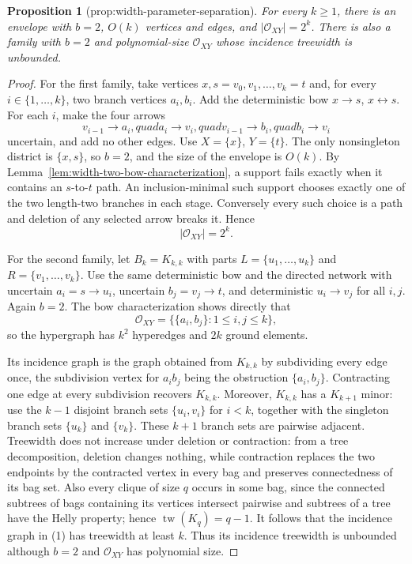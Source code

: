 \documentclass{article}
\newtheorem{proposition}{Proposition}
\begin{document}
\begin{proposition}[prop:width-parameter-separation]\label{prop:width-parameter-separation}
For every \(k\ge1\), there is an envelope with \(b=2\), \(O(k)\) vertices and edges, and \(|\mathcal O_{XY}|=2^k\). There is also a family with \(b=2\) and polynomial-size \(\mathcal O_{XY}\) whose incidence treewidth is unbounded.
\end{proposition}
\begin{proof}
For the first family, take vertices \(x,s=v_0,v_1,\ldots,v_k=t\) and, for every \(i\in\{1,\ldots,k\}\), two branch vertices \(a_i,b_i\).  Add the deterministic bow \(x\to s\), \(x\leftrightarrow s\).  For each \(i\), make the four arrows
\[
 v_{i-1}\to a_i,quad a_i\to v_i,quad
 v_{i-1}\to b_i,quad b_i\to v_i
\]
uncertain, and add no other edges.  Use \(X=\{x\}\), \(Y=\{t\}\).  The only nonsingleton district is \(\{x,s\}\), so \(b=2\), and the size of the envelope is \(O(k)\).  By Lemma~\ref{lem:width-two-bow-characterization}, a support fails exactly when it contains an \(s\)-to-\(t\) path.  An inclusion-minimal such support chooses exactly one of the two length-two branches in each stage.  Conversely every such choice is a path and deletion of any selected arrow breaks it.  Hence
\[
 |\mathcal O_{XY}|=2^k.
\]

For the second family, let \(B_k=K_{k,k}\) with parts \(L=\{u_1,\ldots,u_k\}\) and \(R=\{v_1,\ldots,v_k\}\).  Use the same deterministic bow and the directed network with uncertain \(a_i=s\to u_i\), uncertain \(b_j=v_j\to t\), and deterministic \(u_i\to v_j\) for all \(i,j\).  Again \(b=2\).  The bow characterization shows directly that
\[
 \mathcal O_{XY}=\bigl\{\{a_i,b_j\}:1\le i,j\le k\bigr\}, \tag{1}
\]
so the hypergraph has \(k^2\) hyperedges and \(2k\) ground elements.

Its incidence graph is the graph obtained from \(K_{k,k}\) by subdividing every edge once, the subdivision vertex for \(a_ib_j\) being the obstruction \(\{a_i,b_j\}\).  Contracting one edge at every subdivision recovers \(K_{k,k}\).  Moreover, \(K_{k,k}\) has a \(K_{k+1}\) minor: use the \(k-1\) disjoint branch sets \(\{u_i,v_i\}\) for \(i<k\), together with the singleton branch sets \(\{u_k\}\) and \(\{v_k\}\).  These \(k+1\) branch sets are pairwise adjacent.  Treewidth does not increase under deletion or contraction: from a tree decomposition, deletion changes nothing, while contraction replaces the two endpoints by the contracted vertex in every bag and preserves connectedness of its bag set.  Also every clique of size \(q\) occurs in some bag, since the connected subtrees of bags containing its vertices intersect pairwise and subtrees of a tree have the Helly property; hence \(\operatorname{tw}(K_q)=q-1\).  It follows that the incidence graph in (1) has treewidth at least \(k\).  Thus its incidence treewidth is unbounded although \(b=2\) and \(\mathcal O_{XY}\) has polynomial size.
\end{proof}
\end{document}
